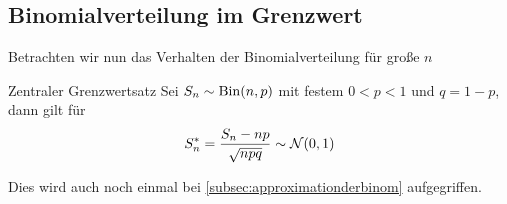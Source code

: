 \subsection{Binomialverteilung im Grenzwert}
Betrachten wir nun das Verhalten der Binomialverteilung für große $n$
\begin{satz}{Zentraler Grenzwertsatz}
	Sei $S_n\sim\operatorname{Bin}(n,p)$ mit festem $0<p<1$ und $q=1-p$, dann gilt für
	\begin{equation*}
		S_n^\ast =\frac{S_n-np}{\sqrt{npq}}\sim\mathcal{N}(0,1)
	\end{equation*}{}
\end{satz}
Dies wird auch noch einmal bei \autoref{subsec:approximationderbinom} aufgegriffen.
